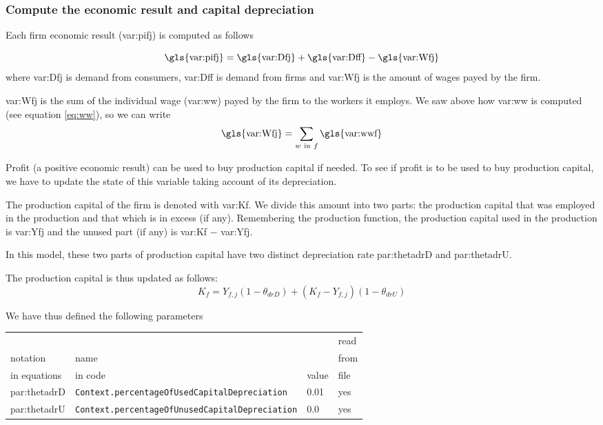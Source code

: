 \documentclass{book}
\begin{document}
\subsubsection{Compute the economic result and capital depreciation}
Each firm economic result (\gls{var:pifj}) is computed as follows

\[
	\textnormal{\gls{var:pifj}} =\textnormal{\gls{var:Dfj}}+\textnormal{\gls{var:Dff}}-\textnormal{\gls{var:Wfj}}
\]
where \gls{var:Dfj} is demand from consumers, \gls{var:Dff} is demand from firms and \gls{var:Wfj} is the amount of wages payed by the firm.

\gls{var:Wfj} is the sum of the individual wage (\gls{var:ww}) payed by the firm to the workers it employs. We saw above how \gls{var:ww} is computed (see equation \ref{eq:ww}), so we can write
\[
	\textnormal{\gls{var:Wfj}}=\sum_{w \ \textnormal{in} \ f} \textnormal{\gls{var:wwf}}
\]


Profit (a positive economic result) can be used to buy production capital if needed. To see if profit is to be used to buy production capital, we have to update the state of this variable taking account of its depreciation.

The production capital of the firm is denoted with \gls{var:Kf}. We divide this amount into two parts: the production capital that was employed in the production and that which is in excess (if any). Remembering the production function, the production capital used in the production is  \gls{var:Yfj} and the unused part (if any) is \gls{var:Kf} $-$ \gls{var:Yfj}.


In this model, these two parts of production capital have two distinct depreciation rate \gls{par:thetadrD} and \gls{par:thetadrU}.

The production capital is thus updated as follows:
\[
	K_f=Y_{f,j}(1-\theta_{drD})+(K_f-Y_{f,j})(1-\theta_{drU})
\]

We have thus defined the following parameters\\

\noindent
\begin{tabular}{l l l l}
	\hline
	& &&read\\
	notation& name &&from\\
	in equations& in code&value&file\\
	\hline
	\hline
 \gls{par:thetadrD}&\verb+Context.percentageOfUsedCapitalDepreciation+&0.01&yes\\
 \gls{par:thetadrU}&\verb+Context.percentageOfUnusedCapitalDepreciation+&0.0&yes\\
	\hline
\end{tabular}
\end{document}
